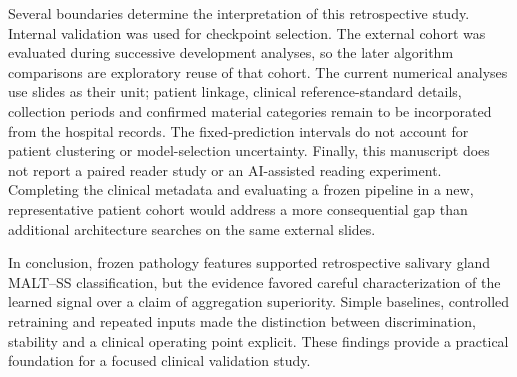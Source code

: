 Several boundaries determine the interpretation of this retrospective study. Internal validation was used for checkpoint selection. The external cohort was evaluated during successive development analyses, so the later algorithm comparisons are exploratory reuse of that cohort. The current numerical analyses use slides as their unit; patient linkage, clinical reference-standard details, collection periods and confirmed material categories remain to be incorporated from the hospital records. The fixed-prediction intervals do not account for patient clustering or model-selection uncertainty. Finally, this manuscript does not report a paired reader study or an AI-assisted reading experiment. Completing the clinical metadata and evaluating a frozen pipeline in a new, representative patient cohort would address a more consequential gap than additional architecture searches on the same external slides.

In conclusion, frozen pathology features supported retrospective salivary gland MALT--SS classification, but the evidence favored careful characterization of the learned signal over a claim of aggregation superiority. Simple baselines, controlled retraining and repeated inputs made the distinction between discrimination, stability and a clinical operating point explicit. These findings provide a practical foundation for a focused clinical validation study.
